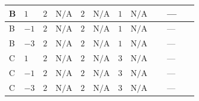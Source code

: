 \documentclass[8pt]{article}
\begin{document}
\begin{landscape}
\begin{longtable}{@{}llcccccc >{\raggedright\arraybackslash}p{0.21\linewidth} >{\raggedright\arraybackslash}p{0.21\linewidth} >{\raggedright\arraybackslash}p{0.21\linewidth}@{}}
\midrule
B & $1$ & $2$ & $\text{N/A}$ & $2$ & $\text{N/A}$ & $1$ & $\text{N/A}$ & \scriptsize\adjustbox{max width=\linewidth}{$\begin{gathered} +4 {\lambda_{HS_2}^{(1)}}^2\end{gathered}$} & --- & \scriptsize\adjustbox{max width=\linewidth}{$\begin{gathered} +\frac{{\lambda_{HS_1}^{(A)}}^2}{4}\end{gathered}$} \\
\midrule
B & $-1$ & $2$ & $\text{N/A}$ & $2$ & $\text{N/A}$ & $1$ & $\text{N/A}$ & \scriptsize\adjustbox{max width=\linewidth}{$\begin{gathered} +4 {\lambda_{HS_2}^{(1)}}^2\end{gathered}$} & --- & \scriptsize\adjustbox{max width=\linewidth}{$\begin{gathered} +\frac{{\lambda_{HS_1}^{(A)}}^2}{4}\end{gathered}$} \\
\midrule
B & $-3$ & $2$ & $\text{N/A}$ & $2$ & $\text{N/A}$ & $1$ & $\text{N/A}$ & \scriptsize\adjustbox{max width=\linewidth}{$\begin{gathered} +4 {\lambda_{HS_2}^{(1)}}^2\end{gathered}$} & --- & \scriptsize\adjustbox{max width=\linewidth}{$\begin{gathered} +\frac{{\lambda_{HS_1}^{(A)}}^2}{4}\end{gathered}$} \\
\midrule
C & $1$ & $2$ & $\text{N/A}$ & $2$ & $\text{N/A}$ & $3$ & $\text{N/A}$ & \scriptsize\adjustbox{max width=\linewidth}{$\begin{gathered} +4 {\lambda_{HS_2}^{(1)}}^2\end{gathered}$} & --- & \scriptsize\adjustbox{max width=\linewidth}{$\begin{gathered} +\frac{{\lambda_{HS_1}^{(A)}}^2}{4}\end{gathered}$} \\
\midrule
C & $-1$ & $2$ & $\text{N/A}$ & $2$ & $\text{N/A}$ & $3$ & $\text{N/A}$ & \scriptsize\adjustbox{max width=\linewidth}{$\begin{gathered} +4 {\lambda_{HS_2}^{(1)}}^2\end{gathered}$} & --- & \scriptsize\adjustbox{max width=\linewidth}{$\begin{gathered} +\frac{{\lambda_{HS_1}^{(A)}}^2}{4}\end{gathered}$} \\
\midrule
C & $-3$ & $2$ & $\text{N/A}$ & $2$ & $\text{N/A}$ & $3$ & $\text{N/A}$ & \scriptsize\adjustbox{max width=\linewidth}{$\begin{gathered} +4 {\lambda_{HS_2}^{(1)}}^2\end{gathered}$} & --- & \scriptsize\adjustbox{max width=\linewidth}{$\begin{gathered} +\frac{{\lambda_{HS_1}^{(A)}}^2}{4}\end{gathered}$} \\

\end{longtable}
\end{landscape}
\end{document}
